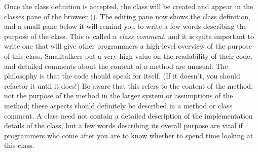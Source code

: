 \documentclass[a4paper,10pt,twoside]{book}
\begin{document}
Once the class definition is accepted, the class will be created and appear in the classes pane of the browser ().
The editing pane now shows the class definition, and a small pane below it will remind you to write a few words describing the purpose of the class.
This is called a \emph{class comment}, and it is quite important to write one that will give other programmers a high-level overview of the purpose of this class.
Smalltalkers put a very high value on the readability of their code, and detailed comments about the content of a method are unusual:
The philosophy is that the code should speak for itself.
(If it doesn't, you should refactor it until it does!) 
Be aware that this refers to the content of the method, not the purpose of the method in the larger system or assumptions of the method; these aspects should definitely be described in a method or class comment.
A class  need not contain a detailed description of the implementation details of the class, but a few words describing its overall purpose are vital if programmers who come after you are to know whether to spend time looking at this class. 

\end{document}
